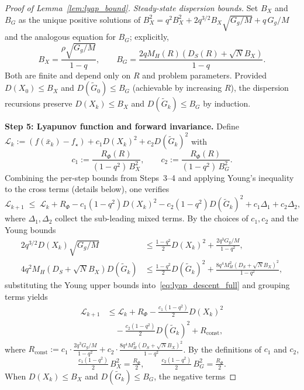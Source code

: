 \documentclass[review,onefignum,onetabnum]{siamart171218}
\begin{document}
\begin{proof}[Proof of Lemma~\ref{lem:lyap_bound}]
\emph{Steady-state dispersion bounds.}
Set $B_X$ and $B_G$ as the unique positive solutions of
$B_X^2 = q^2 B_X^2 + 2q^{3/2}B_X\sqrt{G_g/M}+q\,G_g/M$
and the analogous equation for $B_G$; explicitly,
\begin{equation}\label{eq:disp_fp}
  B_X
  = \frac{\rho\sqrt{G_g/M}}{1-q},
  \qquad
  B_G
  = \frac{2qM_H(R)(D_S(R)+\sqrt{N}B_X)}{1-q}.
\end{equation}
Both are finite and depend only on $R$ and problem parameters.
Provided $D(X_0)\le B_X$ and $D(\tilde G_0)\le B_G$
(achievable by increasing $R$), the dispersion recursions
preserve $D(X_k)\le B_X$ and $D(\tilde G_k)\le B_G$ by induction.

\smallskip
\noindent\textbf{Step 5: Lyapunov function and forward invariance.}
Define
$\mathcal L_k := (f(\bar x_k)-f_\star) + c_1 D(X_k)^2 + c_2 D(\tilde G_k)^2$
with
\[
  c_1 := \frac{R_\Phi(R)}{(1-q^2)\,B_X^2},
  \qquad
  c_2 := \frac{R_\Phi(R)}{(1-q^2)\,B_G^2}.
\]
Combining the per-step bounds from Steps~3--4 and applying Young's
inequality to the cross terms (details below), one verifies
\begin{equation}\label{eq:lyap_descent_full}
  \mathcal L_{k+1}
  \;\le\;
  \mathcal L_k
  + R_\Phi
  - c_1(1-q^2)D(X_k)^2
  - c_2(1-q^2)D(\tilde G_k)^2
  + c_1\Delta_1 + c_2\Delta_2,
\end{equation}
where $\Delta_1,\Delta_2$ collect the sub-leading mixed terms.
By the choices of $c_1,c_2$ and the Young bounds
\begin{align*}
  2q^{3/2}D(X_k)\sqrt{G_g/M}
  &\le \tfrac{1-q^2}{2}D(X_k)^2 + \tfrac{2q^3 G_g/M}{1-q^2},\\
  4q^2 M_H(D_S{+}\sqrt{N}B_X)D(\tilde G_k)
  &\le \tfrac{1-q^2}{2}D(\tilde G_k)^2
  + \tfrac{8q^4 M_H^2(D_S{+}\sqrt{N}B_X)^2}{1-q^2},
\end{align*}
substituting the Young upper bounds into~\eqref{eq:lyap_descent_full}
and grouping terms yields
\begin{align*}
  \mathcal L_{k+1}
  &\le
  \mathcal L_k + R_\Phi
  - \tfrac{c_1(1{-}q^2)}{2}D(X_k)^2\\
  &\quad- \tfrac{c_2(1{-}q^2)}{2}D(\tilde G_k)^2
  + R_{\mathrm{const}},
\end{align*}
where $R_{\mathrm{const}}:=c_1\!\cdot\!\tfrac{2q^3 G_g/M}{1{-}q^2}
+c_2\!\cdot\!\tfrac{8q^4 M_H^2(D_S{+}\sqrt{N}B_X)^2}{1{-}q^2}$.
By the definitions of $c_1$ and $c_2$,
\[
  \tfrac{c_1(1{-}q^2)}{2}\,B_X^2
  = \tfrac{R_\Phi}{2},
  \qquad
  \tfrac{c_2(1{-}q^2)}{2}\,B_G^2
  = \tfrac{R_\Phi}{2}.
\]
When $D(X_k)\le B_X$ and $D(\tilde G_k)\le B_G$, the negative terms

\end{proof}
\end{document}
